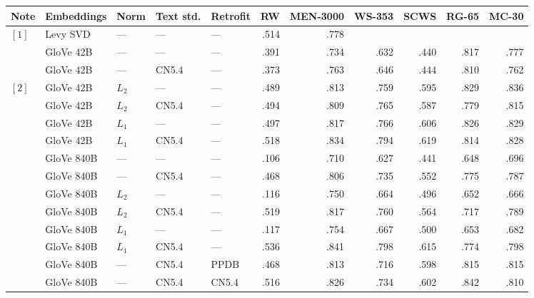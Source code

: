 \documentclass[letterpaper]{article}
\begin{document}
\begin{table*}[t]
\centering
\begin{tabular}{lllllrrrrrr}
\toprule
Note &Embeddings   & Norm  & Text std. & Retrofit &       RW & MEN-3000 &    WS-353 &      SCWS &    RG-65 &    MC-30 \\
\midrule
$[1]$&Levy SVD     & ---   & ---       & ---      &     .514 &     .778 &           &           &          &          \\
\midrule
     &GloVe 42B    & ---   & ---       & ---      &     .391 &     .734 &      .632 &      .440 &     .817 &     .777 \\
     &GloVe 42B    & ---   & CN5.4     & ---      &     .373 &     .763 &      .646 &      .444 &     .810 &     .762 \\
$[2]$&GloVe 42B    & $L_2$ & ---       & ---      &     .489 &     .813 &      .759 &      .595 &     .829 &     .836 \\
     &GloVe 42B    & $L_2$ & CN5.4     & ---      &     .494 &     .809 &      .765 &      .587 &     .779 &     .815 \\
     &GloVe 42B    & $L_1$ & ---       & ---      &     .497 &     .817 &      .766 &      .606 &     .826 &     .829 \\
     &GloVe 42B    & $L_1$ & CN5.4     & ---      &     .518 &     .834 &      .794 &      .619 &     .814 &     .828 \\
\midrule
     &GloVe 840B   & ---   & ---       & ---      &     .106 &     .710 &      .627 &      .441 &     .648 &     .696 \\
     &GloVe 840B   & ---   & CN5.4     & ---      &     .468 &     .806 &      .735 &      .552 &     .775 &     .787 \\
     &GloVe 840B   & $L_2$ & ---       & ---      &     .116 &     .750 &      .664 &      .496 &     .652 &     .666 \\
     &GloVe 840B   & $L_2$ & CN5.4     & ---      &     .519 &     .817 &      .760 &      .564 &     .717 &     .789 \\
     &GloVe 840B   & $L_1$ & ---       & ---      &     .117 &     .754 &      .667 &      .500 &     .653 &     .682 \\
     &GloVe 840B   & $L_1$ & CN5.4     & ---      &     .536 &     .841 &      .798 &      .615 &     .774 &     .798 \\
\midrule
     &GloVe 840B   & ---   & CN5.4     & PPDB     &     .468 &     .813 &      .716 &      .598 &     .815 &     .815 \\
     &GloVe 840B   & ---   & CN5.4     & CN5.4    &     .516 &     .826 &      .734 &      .602 &     .842 &     .810 \\

\end{tabular}
\end{table*}
\end{document}
